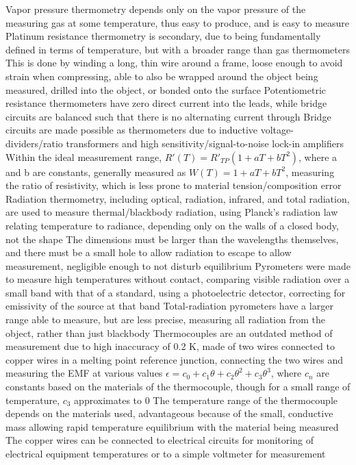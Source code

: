 \documentclass[11 pt, twoside]{article}
\newenvironment{outline*}
{
	\begin{outline}[enumerate]
	}
	{\end{outline}
}
\begin{document}
\begin{outline*}
\1 Vapor pressure thermometry depends only on the vapor pressure of the measuring gas at some temperature, thus easy to produce, and is easy to measure
\1 Platinum resistance thermometry is secondary, due to being fundamentally defined in terms of temperature, but with a broader range than gas thermometers
\2 This is done by winding a long, thin wire around a frame, loose enough to avoid strain when compressing, able to also be wrapped around the object being measured, drilled into the object, or bonded onto the surface
\2 Potentiometric resistance thermometers have zero direct current into the leads, while bridge circuits are balanced such that there is no alternating current through
\3 Bridge circuits are made possible as thermometers due to inductive voltage-dividers/ratio transformers and high sensitivity/signal-to-noise lock-in amplifiers
\2 Within the ideal measurement range, $R'(T) = R'_{TP}(1 + aT + bT^2)$, where a and b are constants, generally measured as $W(T) = 1 + aT + bT^2$, measuring the ratio of resistivity, which is less prone to material tension/composition error
\1 Radiation thermometry, including optical, radiation, infrared, and total radiation, are used to measure thermal/blackbody radiation, using Planck's radiation law relating temperature to radiance, depending only on the walls of a closed body, not the shape
\2 The dimensions must be larger than the wavelengths themselves, and there must be a small hole to allow radiation to escape to allow measurement, negligible enough to not disturb equilibrium
\2 Pyrometers were made to measure high temperatures without contact, comparing visible radiation over a small band with that of a standard, using a photoelectric detector, correcting for emissivity of the source at that band
\2 Total-radiation pyrometers have a larger range able to measure, but are less precise, measuring all radiation from the object, rather than just blackbody
\1 Thermocouples are an outdated method of measurement due to high inaccuracy of 0.2 K, made of two wires connected to copper wires in a melting point reference junction, connecting the two wires and measuring the EMF at various values
\2 $\epsilon = c_0 + c_1\theta + c_2\theta^2 + c_3\theta^3$, where $c_n$ are constants based on the materials of the thermocouple, though for a small range of temperature, $c_3$ approximates to 0
\2 The temperature range of the thermocouple depends on the materials used, advantageous because of the small, conductive mass allowing rapid temperature equilibrium with the material being measured
\2 The copper wires can be connected to electrical circuits for monitoring of electrical equipment temperatures or to a simple voltmeter for measurement
\end{outline*}
\end{document}
